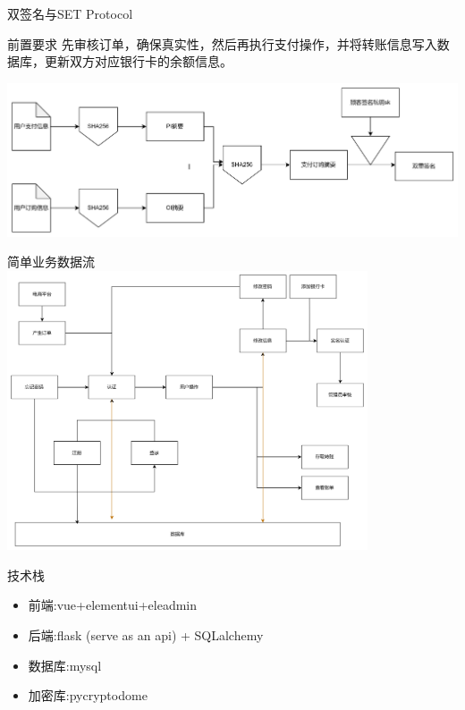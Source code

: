 \documentclass[]{beamer}
\begin{document}
    \begin{frame}{双签名与SET Protocol}

            \begin{block}{前置要求}
                先审核订单，确保真实性，然后再执行支付操作，并将转账信息写入数据库，更新双方对应银行卡的余额信息。
            \end{block}
        
        \includegraphics[width=1\textwidth]{SETprotocol.png}

    \end{frame}


    \begin{frame}{简单业务数据流}
        \includegraphics[width=0.8\textwidth]{summary.png}
    \end{frame}

    \begin{frame}{技术栈}
        \begin{itemize}
            \item 前端:vue+elementui+eleadmin
            \item 后端:flask (serve as an api) + SQLalchemy
            \item 数据库:mysql
            \item 加密库:pycryptodome
        \end{itemize}
    \end{frame}
\end{document}
